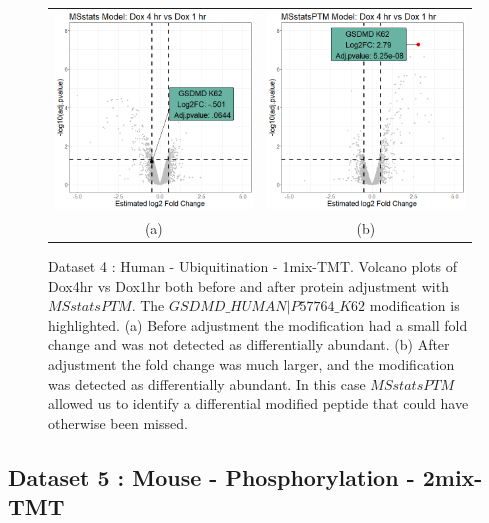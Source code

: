 \documentclass{mcp}
\begin{document}
\begin{figure}[ht]
\centering
 \begin{tabular}{cc}
	\includegraphics[width=.475\textwidth]{sim_new/SuppFigure6a.png}
	&
	\includegraphics[width=.475\textwidth]{sim_new/SuppFigure6b.png}\\
	(a)&(b)
\end{tabular}
\caption{Dataset 4 : Human - Ubiquitination - 1mix-TMT. Volcano plots of Dox4hr vs Dox1hr both before and after protein adjustment with $MSstatsPTM$. The $GSDMD\_HUMAN|P57764\_K62$ modification is highlighted. (a) Before adjustment the modification had a small fold change and was not detected as differentially abundant. (b) After adjustment the fold change was much larger, and the modification was detected as differentially abundant. In this case $MSstatsPTM$ allowed us to identify a differential modified peptide that could have otherwise been missed.}

\label{fig:ipah_figures}
\end{figure}



\clearpage
\subsection{Dataset 5 : Mouse - Phosphorylation - 2mix-TMT}
\label{sec:shigella}
\end{document}
